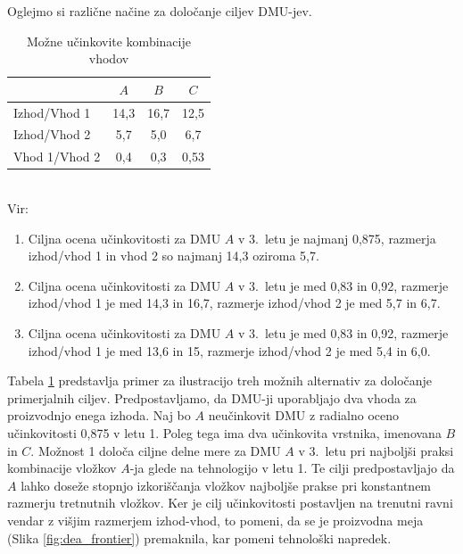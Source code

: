 \documentclass[12pt,a4paper]{article}
\theoremstyle{definition}
\begin{document}
Oglejmo si različne načine za določanje ciljev DMU-jev.

\begin{table}[H]
    \centering
    \caption{Možne učinkovite kombinacije vhodov}
    \label{table:dmu_primer}
    \begin{tabular}{|l|c|c|c|}
    \hline
    & $A$ & $B$ & $C$ \\
    \hline
    Izhod/Vhod 1 & 14,3 & 16,7 & 12,5 \\
    Izhod/Vhod 2 & 5,7 & 5,0 & 6,7 \\
    Vhod 1/Vhod 2 & 0,4 & 0,3 & 0,53 \\
    \hline
    \end{tabular}
    \\ \vspace{0.2em}
    \footnotesize{Vir: \cite{Yaisawarng2002}}
\end{table}
    
\begin{enumerate}
    \item[Možnost 1:] Ciljna ocena učinkovitosti za 
    DMU $A$ v 3.\ letu je najmanj 0{,}875, razmerja 
    izhod/vhod 1 in vhod 2 so najmanj 14,3 oziroma 5,7.
    
    \item[Možnost 2:] Ciljna ocena učinkovitosti za DMU
    $A$ v 3.\ letu je med 0{,}83 in 0{,}92, razmerje 
    izhod/vhod 1 je med 14,3 in 16,7, razmerje izhod/vhod 
    2 je med 5{,}7 in 6{,}7.
    
    \item[Možnost 3:] Ciljna ocena učinkovitosti za DMU
    $A$ v 3.\ letu je med 0{,}83 in 0{,}92, razmerje 
    izhod/vhod 1 je med 13{,}6 in 15, razmerje 
    izhod/vhod 2 je med 5{,}4 in 6{,}0.
\end{enumerate}

Tabela \ref{table:dmu_primer} predstavlja primer za ilustracijo
treh možnih alternativ za določanje primerjalnih
ciljev. Predpostavljamo, da DMU-ji uporabljajo dva
vhoda za proizvodnjo enega izhoda. Naj bo $A$ neučinkovit
DMU z radialno oceno učinkovitosti 0{,}875 v letu 1.
Poleg tega ima dva učinkovita vrstnika, imenovana 
$B$ in $C$. Možnost 1 določa ciljne delne mere za DMU
$A$ v 3.\ letu pri najboljši praksi kombinacije vložkov
$A$-ja glede na tehnologijo v letu 1. Te cilji 
predpostavljajo da $A$ lahko doseže stopnjo
izkoriščanja vložkov najboljše prakse pri konstantnem
razmerju tretnutnih vložkov. Ker je cilj učinkovitosti
postavljen na trenutni ravni vendar z višjim razmerjem
izhod-vhod, to pomeni, da se je proizvodna meja (Slika
\ref{fig:dea_frontier}) premaknila, kar pomeni tehnološki
napredek. \cite{Yaisawarng2002}
\end{document}
